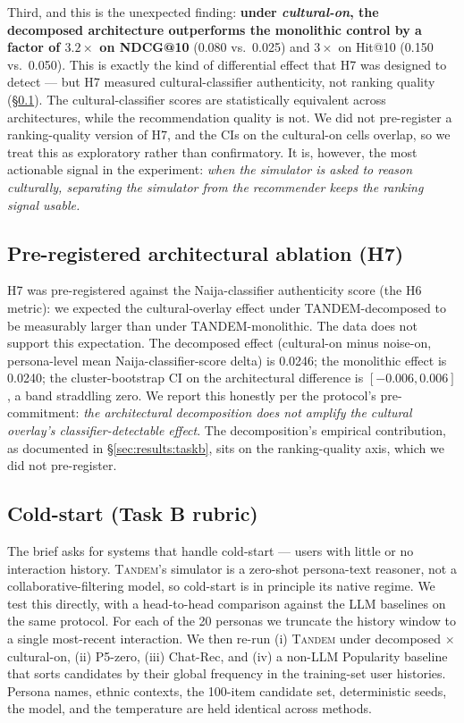 \documentclass[8pt,twocolumn,a4paper]{extarticle}
\begin{document}
Third, and this is the unexpected finding: \textbf{under \emph{cultural-on}, the decomposed architecture outperforms the monolithic control by a factor of $3.2\times$ on NDCG@10} (0.080 vs.\ 0.025) and $3\times$ on Hit@10 (0.150 vs.\ 0.050). This is exactly the kind of differential effect that H7 was designed to detect --- but H7 measured cultural-classifier authenticity, not ranking quality (\S\ref{sec:results:h7}). The cultural-classifier scores are statistically equivalent across architectures, while the recommendation quality is not. We did not pre-register a ranking-quality version of H7, and the CIs on the cultural-on cells overlap, so we treat this as exploratory rather than confirmatory. It is, however, the most actionable signal in the experiment: \emph{when the simulator is asked to reason culturally, separating the simulator from the recommender keeps the ranking signal usable.}

\subsection{Pre-registered architectural ablation (H7)}
\label{sec:results:h7}

H7 was pre-registered against the Naija-classifier authenticity score (the H6 metric): we expected the cultural-overlay effect under TANDEM-decomposed to be measurably larger than under TANDEM-monolithic. The data does not support this expectation. The decomposed effect (cultural-on minus noise-on, persona-level mean Naija-classifier-score delta) is 0.0246; the monolithic effect is 0.0240; the cluster-bootstrap CI on the architectural difference is $[-0.006, 0.006]$, a band straddling zero. We report this honestly per the protocol's pre-commitment: \emph{the architectural decomposition does not amplify the cultural overlay's classifier-detectable effect}. The decomposition's empirical contribution, as documented in \S\ref{sec:results:taskb}, sits on the ranking-quality axis, which we did not pre-register.

\subsection{Cold-start (Task B rubric)}
\label{sec:results:coldstart}

The brief asks for systems that handle cold-start --- users with little or no interaction history. \textsc{Tandem}'s simulator is a zero-shot persona-text reasoner, not a collaborative-filtering model, so cold-start is in principle its native regime. We test this directly, with a head-to-head comparison against the LLM baselines on the same protocol. For each of the 20 personas we truncate the history window to a single most-recent interaction. We then re-run (i) \textsc{Tandem} under decomposed $\times$ cultural-on, (ii) P5-zero, (iii) Chat-Rec, and (iv) a non-LLM Popularity baseline that sorts candidates by their global frequency in the training-set user histories. Persona names, ethnic contexts, the 100-item candidate set, deterministic seeds, the model, and the temperature are held identical across methods.
\end{document}
